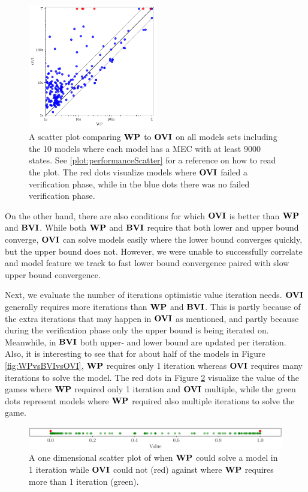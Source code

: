 \begin{figure}[h!]
    \centering
    \includegraphics[width=0.5\textwidth]{figures/OVI_verifs.pdf}
    \caption{A scatter plot comparing $\mathbf{WP}$ to $\OVI$ on all models sets including the 10 models where each model has a MEC with at least 9000 states. See \ref{plot:performanceScatter} for a reference on how to read the plot.
    The red dots visualize models where $\OVI$ failed a verification phase, while in the blue dots there was no failed verification phase.
    }%
    \label{fig:OVIverifs}%
    \end{figure}

On the other hand, there are also conditions for which $\OVI$ is better than $\mathbf{WP}$ and $\mathbf{BVI}$.
While both $\mathbf{WP}$ and $\mathbf{BVI}$ require that both lower and upper bound converge, 
$\OVI$ can solve models easily where the lower bound converges quickly, but the upper bound does not.
However, we were unable to successfully correlate and model feature we track to fast lower bound convergence paired with slow upper bound convergence. 

Next, we evaluate the number of iterations optimistic value iteration needs. $\OVI$ generally requires more iterations than $\mathbf{WP}$ and $\mathbf{BVI}$. This is partly because of the extra iterations that may happen in $\OVI$ as mentioned, 
and partly because during the verification phase only the upper bound is being iterated on. Meanwhile, in $\mathbf{BVI}$ both upper- and lower bound are updated per iteration.
Also, it is interesting to see that for about half of the models in Figure \ref{fig:WPvsBVIvsOVI}, $\mathbf{WP}$ requires only 1 iteration whereas $\OVI$ requires many iterations to solve the model.
The red dots in Figure \ref{fig:OVIinstantCompute} visualize the value of the games where $\mathbf{WP}$ required only 1 iteration and $\OVI$ multiple,
while the green dots represent models where $\mathbf{WP}$ required also multiple iterations to solve the game.
\FloatBarrier
\begin{figure}[h!]
    \centering
    \includegraphics[width=1\textwidth]{figures/OVI_Bad_At_Computing_Instant_Values.png}
    \caption[$\OVI$ cannot instantly compute models]{
        A one dimensional scatter plot of when $\mathbf{WP}$ could solve a model in 1 iteration while $\OVI$ could not (red) 
        against where $\mathbf{WP}$ requires more than 1 iteration (green).
    }
    \label{fig:OVIinstantCompute}
\end{figure}
\FloatBarrier

